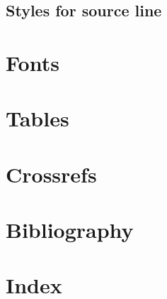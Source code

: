 \documentclass[output=book
	      ,nonflat
	      ,modfonts
	      ]{langsci/langscibook}
\begin{document}
 

\subsection{Styles for source line}

\section{Fonts}
% 

\section{Tables}\label{sec:tables}

\section{Crossrefs}

\section{Bibliography}
 
\section{Index}
 
%  


%  
 
%  
%  
%  
%  
 

\end{document}
